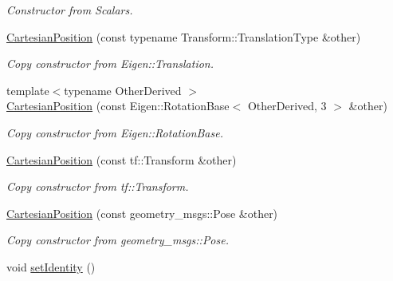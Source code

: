 \begin{DoxyCompactItemize}
\begin{DoxyCompactList}\small\item\em Constructor from Scalars. \end{DoxyCompactList}\item 
\hyperlink{classow__core_1_1CartesianPosition_a677d43bf7ee688ef2561e3384e0d87af}{Cartesian\+Position} (const typename Transform\+::\+Translation\+Type \&other)
\begin{DoxyCompactList}\small\item\em Copy constructor from Eigen\+::\+Translation. \end{DoxyCompactList}\item 
{\footnotesize template$<$typename Other\+Derived $>$ }\\\hyperlink{classow__core_1_1CartesianPosition_a5facbd98e241518b96c639f645352aff}{Cartesian\+Position} (const Eigen\+::\+Rotation\+Base$<$ Other\+Derived, 3 $>$ \&other)
\begin{DoxyCompactList}\small\item\em Copy constructor from Eigen\+::\+Rotation\+Base. \end{DoxyCompactList}\item 
\hyperlink{classow__core_1_1CartesianPosition_a39f4c6d292b1613e47581e2c5c0584d3}{Cartesian\+Position} (const tf\+::\+Transform \&other)\hypertarget{classow__core_1_1CartesianPosition_a39f4c6d292b1613e47581e2c5c0584d3}{}\label{classow__core_1_1CartesianPosition_a39f4c6d292b1613e47581e2c5c0584d3}

\begin{DoxyCompactList}\small\item\em Copy constructor from tf\+::\+Transform. \end{DoxyCompactList}\item 
\hyperlink{classow__core_1_1CartesianPosition_a12ac7a60828d470c82312a2d9ddcf10a}{Cartesian\+Position} (const geometry\+\_\+msgs\+::\+Pose \&other)\hypertarget{classow__core_1_1CartesianPosition_a12ac7a60828d470c82312a2d9ddcf10a}{}\label{classow__core_1_1CartesianPosition_a12ac7a60828d470c82312a2d9ddcf10a}

\begin{DoxyCompactList}\small\item\em Copy constructor from geometry\+\_\+msgs\+::\+Pose. \end{DoxyCompactList}\item 
void \hyperlink{classow__core_1_1CartesianPosition_a77f179c52a4754479ada9b5ecbdd325a}{set\+Identity} ()\hypertarget{classow__core_1_1CartesianPosition_a77f179c52a4754479ada9b5ecbdd325a}{}\label{classow__core_1_1CartesianPosition_a77f179c52a4754479ada9b5ecbdd325a}


\end{DoxyCompactItemize}
